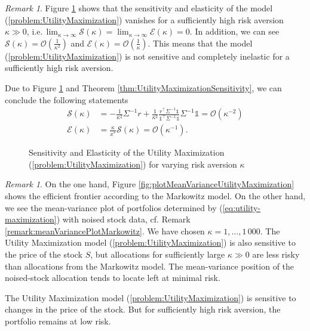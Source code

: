 \documentclass[a4paper, english, 11pt, onecolumn, oneside, final]{article}
\numberwithin{equation}{section}   %
\newcommand{\one}{\mathds 1}
\newcommand{\precision}{\Sigma^{-1}}
\newcommand{\B}{r^\top\Sigma^{-1}\one}
\newcommand{\C}{\one^\top\Sigma^{-1}\one}
\theoremstyle{plain}
\theoremstyle{definition}
\theoremstyle{remark}
\newtheorem{remark}     [theorem]{Remark}
\begin{document}
\begin{remark}
    Figure \ref{fig:plotSensitivityElasticityUtilityMaximization} shows that the sensitivity and elasticity of the model (\ref{problem:UtilityMaximization}) vanishes for a sufficiently high risk aversion $\kappa\gg0$, i.e.\,$\lim_{\kappa\to\infty}\mathcal{S}(\kappa)=\lim_{\kappa\to\infty}\mathcal{E}(\kappa)=0$. In addition, we can see $\mathcal{S}(\kappa)=\mathcal{O}(\frac{1}{\kappa^2})$ and $\mathcal{E}(\kappa)=\mathcal{O}(\frac{1}{\kappa})$. This means that the model (\ref{problem:UtilityMaximization}) is not sensitive and completely inelastic for a sufficiently high risk aversion. \medskip
    
    Due to Figure \ref{fig:plotSensitivityElasticityUtilityMaximization} and Theorem \ref{thm:UtilityMaximizationSensitivity}, we can conclude the following statements
    \begin{equation*}
        \begin{aligned}
            \mathcal{S}(\kappa) &= -\frac{1}{\kappa^2}\precision r + \frac{1}{\kappa^2}\frac{\B}{\C}\precision\one = \mathcal{O}(\kappa^{-2}) \\
            \mathcal{E}(\kappa) &= \frac{\kappa}{x^*}\mathcal{S}(\kappa) = \mathcal{O}(\kappa^{-1}).
        \end{aligned}
    \end{equation*}
\end{remark}
\begin{figure}[h]
  
  \caption{Sensitivity and Elasticity of the Utility Maximization (\ref{problem:UtilityMaximization}) for varying risk aversion $\kappa$}
  \label{fig:plotSensitivityElasticityUtilityMaximization}
\end{figure}
\begin{remark}
    On the one hand, Figure \ref{fig:plotMeanVarianceUtilityMaximization} shows the efficient frontier according to the Markowitz model. On the other hand, we see the mean-variance plot of portfolios determined by (\ref{eq:utility-maximization}) with noised stock data, cf. Remark \ref{remark:meanVariancePlotMarkowitz}. We have chosen $\kappa=1,\ldots,1\,000$. The Utility Maximization model (\ref{problem:UtilityMaximization}) is also sensitive to the price of the stock $S$, but allocations for sufficiently large $\kappa\gg0$ are less risky than allocations from the Markowitz model. The mean-variance position of the noised-stock allocation tends to locate left at minimal risk. \medskip

    The Utility Maximization model (\ref{problem:UtilityMaximization}) is sensitive to changes in the price of the stock. But for sufficiently high risk aversion, the portfolio remains at low risk.
\end{remark}
\end{document}
